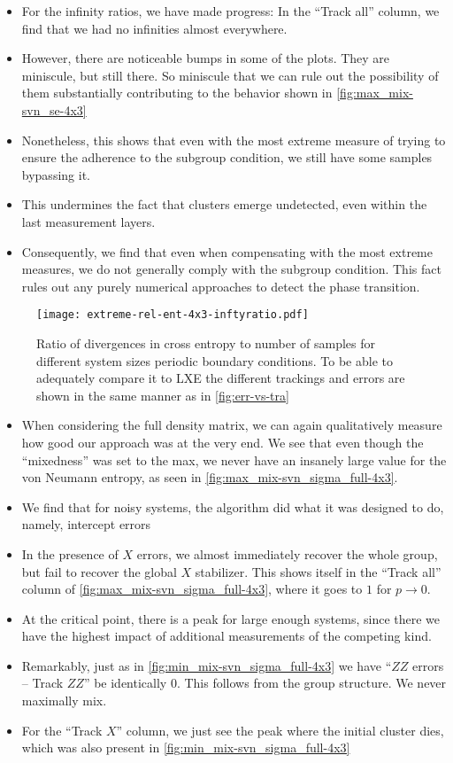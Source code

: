 \begin{itemize}
  \item For the infinity ratios, we have made progress: In the \enquote{Track
    all} column, we find that we had no infinities almost everywhere.
  \item However, there are noticeable bumps in some of the plots. They are
    miniscule, but still there. So miniscule that we can rule out the
    possibility of them substantially contributing to the behavior shown in
    \cref{fig:max_mix-svn_se-4x3}
  \item Nonetheless, this shows that even with the most extreme measure of
    trying to ensure the adherence to the subgroup condition, we still have
    some samples bypassing it.
  \item This undermines the fact that clusters emerge undetected, even within
    the last measurement layers.
  \item Consequently, we find that even when compensating with the most extreme
    measures, we do not generally comply with the subgroup condition. This
    fact rules out any purely numerical approaches to detect the phase
    transition.
\end{itemize}
\begin{figure}[p]
  \centering
  \texttt{[image: extreme-rel-ent-4x3-inftyratio.pdf]}
  \caption{Ratio of divergences in cross entropy to number of samples for
    different system sizes
  periodic boundary conditions. To be able to adequately compare it to LXE the
different trackings and errors are shown in the same manner as in
\cref{fig:err-vs-tra}}
  \label{fig:max_mix-inftyratio-4x3}
\end{figure}
\begin{itemize}
  \item When considering the full density matrix, we can again qualitatively
    measure how good our approach was at the very end. We see that even though
    the \enquote{mixedness} was set to the max, we never have an insanely large
    value for the von Neumann entropy, as seen in
    \cref{fig:max_mix-svn_sigma_full-4x3}.
  \item We find that for noisy systems, the algorithm did what it was designed
    to do, namely, intercept errors
  \item In the presence of $X$ errors, we almost immediately recover the whole
    group, but fail to recover the global $X$ stabilizer. This shows itself in
    the \enquote{Track all} column of \cref{fig:max_mix-svn_sigma_full-4x3},
    where it goes to $1$ for $p\to 0$.
  \item At the critical point, there is a peak for large enough systems, since
    there we have the highest impact of additional measurements of the
    competing kind.
  \item Remarkably, just as in \cref{fig:min_mix-svn_sigma_full-4x3} we have
    \enquote{$ZZ$ errors -- Track $ZZ$} be identically $0$. This follows from
    the group structure. We never maximally mix.
  \item For the \enquote{Track $X$} column, we just see the peak where the
    initial cluster dies, which was also present in
    \cref{fig:min_mix-svn_sigma_full-4x3}
\end{itemize}
